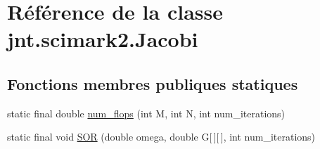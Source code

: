 \hypertarget{classjnt_1_1scimark2_1_1Jacobi}{\section{Référence de la classe jnt.\-scimark2.\-Jacobi}
\label{classjnt_1_1scimark2_1_1Jacobi}
}
\subsection*{Fonctions membres publiques statiques}
\begin{DoxyCompactItemize}
\item 
static final double \hyperlink{classjnt_1_1scimark2_1_1Jacobi_a799a1ffb5d0573443ac3e0829111303c}{num\-\_\-flops} (int M, int N, int num\-\_\-iterations)
\item 
static final void \hyperlink{classjnt_1_1scimark2_1_1Jacobi_a0c573f7b93dd5b090eae7ddd90b7045b}{S\-O\-R} (double omega, double G\mbox{[}$\,$\mbox{]}\mbox{[}$\,$\mbox{]}, int num\-\_\-iterations)
\end{DoxyCompactItemize}


